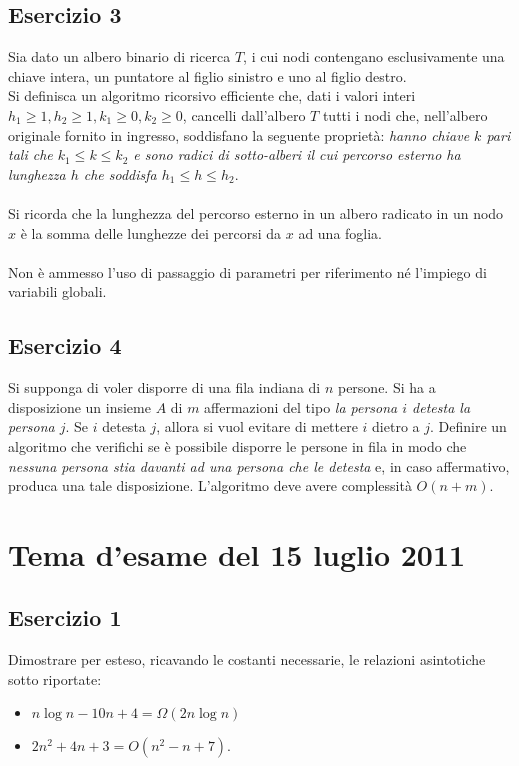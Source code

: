 \documentclass[11pt,a4paper,oneside]{article}
\begin{document}
\subsection*{Esercizio 3} Sia dato un albero binario di ricerca $T$, i cui nodi contengano esclusivamente una chiave intera, un puntatore al figlio sinistro e uno al figlio destro.\\Si definisca un algoritmo ricorsivo efficiente che, dati i valori interi $h_1 \geq 1, h_2 \geq 1, k_1 \geq 0, k_2 \geq 0$, cancelli dall'albero $T$ tutti i nodi che, nell'albero originale fornito in ingresso, soddisfano la seguente proprietà: \textit{hanno chiave $k$ pari tali che $k_1 \leq k \leq k_2$ e sono radici di sotto-alberi il cui percorso esterno ha lunghezza $h$ che soddisfa $h_1 \leq h \leq h_2$}.\\\\Si ricorda che la lunghezza del percorso esterno in un albero radicato in un nodo $x$ è la somma delle lunghezze dei percorsi da $x$ ad una foglia.\\\\Non è ammesso l'uso di passaggio di parametri per riferimento né l'impiego di variabili globali.
\subsection*{Esercizio 4} Si supponga di voler disporre di una fila indiana di $n$ persone. Si ha a disposizione un insieme $A$ di $m$ affermazioni del tipo \textit{la persona $i$ detesta la persona $j$}. Se $i$ detesta $j$, allora si vuol evitare di mettere $i$ dietro a $j$. Definire un algoritmo che verifichi se è possibile disporre le persone in fila in modo che \textit{nessuna persona stia davanti ad una persona che le detesta} e, in caso affermativo, produca una tale disposizione. L'algoritmo deve avere complessità $O(n+m)$.
\pagebreak
%
%
\section*{Tema d'esame del 15 luglio 2011}
\subsection*{Esercizio 1} Dimostrare per esteso, ricavando le costanti necessarie, le relazioni asintotiche sotto riportate:
\begin{itemize}
	\item $n\log{n} - 10n+4 = \Omega(2n\log{n})$
	\item $2n^2+4n+3 = O(n^2-n+7)$.
\end{itemize}
\end{document}
